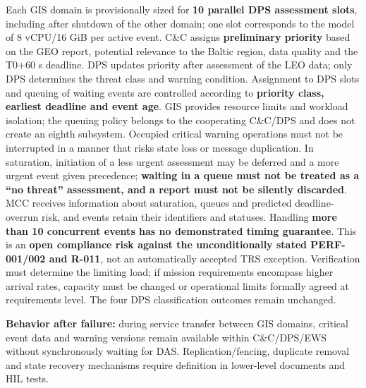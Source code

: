 Each GIS domain is provisionally sized for \textbf{10 parallel DPS assessment slots}, including after shutdown of the other domain; one slot corresponds to the model of 8 vCPU/\allowbreak{}16 GiB per active event. C\&C assigns \textbf{preliminary priority} based on the GEO report, potential relevance to the Baltic region, data quality and the T0+60 s deadline. DPS updates priority after assessment of the LEO data; only DPS determines the threat class and warning condition. Assignment to DPS slots and queuing of waiting events are controlled according to \textbf{priority class, earliest deadline and event age}. GIS provides resource limits and workload isolation; the queuing policy belongs to the cooperating C\&C/\allowbreak{}DPS and does not create an eighth subsystem. Occupied critical warning operations must not be interrupted in a manner that risks state loss or message duplication. In saturation, initiation of a less urgent assessment may be deferred and a more urgent event given precedence; \textbf{waiting in a queue must not be treated as a “no threat” assessment, and a report must not be silently discarded}. MCC receives information about saturation, queues and predicted deadline-overrun risk, and events retain their identifiers and statuses. Handling \textbf{more than 10 concurrent events has no demonstrated timing guarantee}. This is an \textbf{open compliance risk against the unconditionally stated PERF-001/\allowbreak{}002 and R-011}, not an automatically accepted TRS exception. Verification must determine the limiting load; if mission requirements encompass higher arrival rates, capacity must be changed or operational limits formally agreed at requirements level. The four DPS classification outcomes remain unchanged.

\textbf{Behavior after failure:} during service transfer between GIS domains, critical event data and warning versions remain available within C\&C/\allowbreak{}DPS/\allowbreak{}EWS without synchronously waiting for DAS. Replication/\allowbreak{}fencing, duplicate removal and state recovery mechanisms require definition in lower-level documents and HIL tests.

